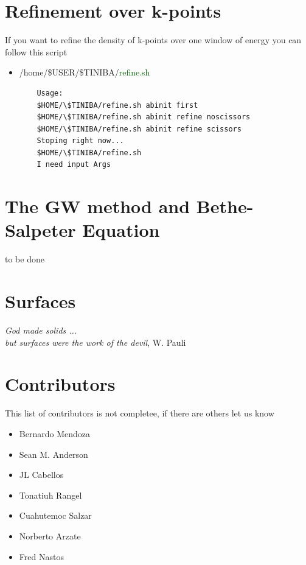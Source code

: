 \documentclass[12pt]{article}
\numberwithin{equation}{section}
\begin{document}
\section{Refinement over k-points}
If you want to refine the density of k-points over one window of energy 
you can follow this script 
\begin{itemize}
 \item /home/\$USER/\$TINIBA/\textcolor{darkgreen}{refine.sh} 
\begin{verbatim}
	Usage:
	$HOME/\$TINIBA/refine.sh abinit first
	$HOME/\$TINIBA/refine.sh abinit refine noscissors
	$HOME/\$TINIBA/refine.sh abinit refine scissors
	Stoping right now...
	$HOME/\$TINIBA/refine.sh
	I need input Args
\end{verbatim}

\end{itemize}


\section{The GW method and Bethe-Salpeter Equation}
to be done 


\section{Surfaces }
\emph{God made solids ...\\
      but surfaces were the work of the devil}, W. Pauli\\                                  



\section{Contributors}
This list of contributors is not completee, if there are others let us know
\begin{itemize}
\item Bernardo Mendoza
\item Sean M. Anderson
\item JL Cabellos
\item Tonatiuh Rangel
\item Cuahutemoc Salzar
\item Norberto Arzate
\item Fred Nastos  
\end{itemize}
\end{document}
